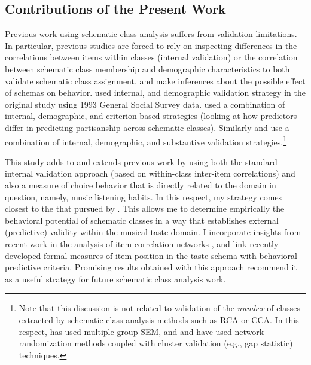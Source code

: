 \documentclass[preprint, authoryear,11pt, 3p]{elsarticle}
\begin{document}
\subsection{Contributions of the Present Work}
Previous work using schematic class analysis suffers from validation limitations. In particular, previous studies are forced to rely on inspecting differences in the correlations between items within classes (internal validation) or the correlation between schematic class membership and demographic characteristics to both validate schematic class assignment, and make inferences about the possible effect of schemas on behavior. \citet{goldberg2011mapping} used internal, and demographic validation strategy in the original study using 1993 General Social Survey data.\citet{baldassarri2014neither} used a combination of internal, demographic, and criterion-based strategies (looking at how predictors differ in predicting partisanship across schematic classes). Similarly \citet{dimaggio2018searching} and \citet{dimaggio2017culture} use a combination of internal, demographic, and substantive validation strategies.\footnote{Note that this discussion is not related to validation of the \emph{number} of classes extracted by schematic class analysis methods such as RCA or CCA. In this respect, \citet{boutyline2017improving} has used multiple group SEM, and \citet{dimaggio2017culture} and \citet{dimaggio2018searching} have used network randomization methods coupled with cluster validation (e.g., gap statistic) techniques.}

This study adds to and extends previous work by using both the standard internal validation approach (based on within-class inter-item correlations) and also a measure of choice behavior that is directly related to the domain in question, namely, music listening habits. In this respect, my strategy comes closest to the that pursued by \citet{baldassarri2014neither}. This allows me to determine empirically the behavioral potential of schematic classes in a way that establishes external (predictive) validity within the musical taste domain. I incorporate insights from recent work in the analysis of item correlation networks \citep{epskamp2012qgraph}, and link recently developed formal measures of item position in the taste schema with behavioral predictive criteria. Promising results obtained with this approach recommend it as a useful strategy for future schematic class analysis work. 
\end{document}
